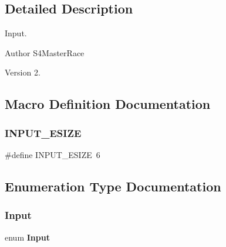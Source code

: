 \subsection{Detailed Description}
Input. 

\begin{DoxyAuthor}{Author}
S4\+Master\+Race 
\end{DoxyAuthor}
\begin{DoxyVersion}{Version}
2. 
\end{DoxyVersion}


\subsection{Macro Definition Documentation}
\mbox{\label{input_8h_a2737fc7864bdc5313f58375cf0e56cd5}} 
\subsubsection{I\+N\+P\+U\+T\+\_\+\+E\+S\+I\+ZE}
{\footnotesize\ttfamily \#define I\+N\+P\+U\+T\+\_\+\+E\+S\+I\+ZE~6}



\subsection{Enumeration Type Documentation}
\mbox{\label{input_8h_a080a822f0093973313bd644e517a5090}} 
\subsubsection{Input}
{\footnotesize\ttfamily enum \textbf{ Input}}


